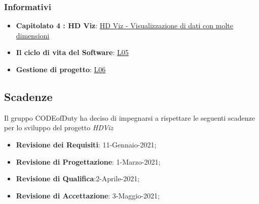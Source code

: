 	\subsubsection{Informativi}
		\begin{itemize}
			\item \textbf{Capitolato 4 : HD Viz}: \href{https://www.math.unipd.it/~tullio/IS-1/2020/Progetto/C4.pdf}{HD Viz - Visualizzazione di dati con molte dimensioni}
			\item \textbf{Il ciclo di vita del Software}: \href{https://www.math.unipd.it/~tullio/IS-1/2020/Dispense/L05.pdf}{L05}
			\item \textbf{Gestione di progetto}: \href{https://www.math.unipd.it/~tullio/IS-1/2020/Dispense/L06.pdf}{L06}
		\end{itemize}
\subsection{Scadenze}
	Il gruppo CODEofDuty ha deciso di impegnarsi a rispettare le seguenti scadenze per lo sviluppo del progetto \emph{HDViz}
	\begin{itemize}
		\item \textbf{Revisione dei Requisiti}: 11-Gennaio-2021;
		\item \textbf{Revisione di Progettazione}: 1-Marzo-2021;
		\item \textbf{Revisione di Qualifica}:2-Aprile-2021;
		\item \textbf{Revisione di Accettazione}: 3-Maggio-2021;
	\end{itemize}
